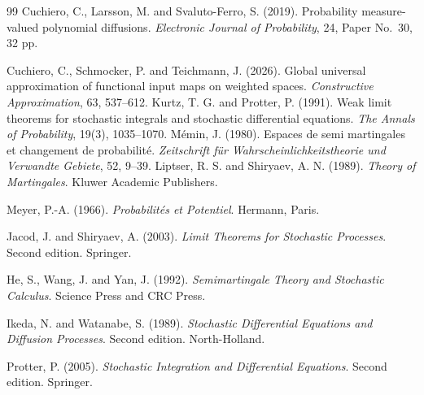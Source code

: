 \documentclass[a4paper,10pt]{article}
\begin{document}
\begin{thebibliography}{99}
Cuchiero, C., Larsson, M. and Svaluto-Ferro, S. (2019).
Probability measure-valued polynomial diffusions.
\emph{Electronic Journal of Probability}, 24, Paper No.~30, 32 pp.

Cuchiero, C., Schmocker, P. and Teichmann, J. (2026).
Global universal approximation of functional input maps on weighted
spaces.
\emph{Constructive Approximation}, 63, 537--612.
Kurtz, T. G. and Protter, P. (1991).
Weak limit theorems for stochastic integrals and stochastic differential equations.
\emph{The Annals of Probability}, 19(3), 1035--1070.
M\'emin, J. (1980).
Espaces de semi martingales et changement de probabilit\'e.
\emph{Zeitschrift f\"ur Wahrscheinlichkeitstheorie und Verwandte Gebiete},
52, 9--39.
Liptser, R. S. and Shiryaev, A. N. (1989).
\emph{Theory of Martingales}.
Kluwer Academic Publishers.


Meyer, P.-A. (1966).
\emph{Probabilit\'es et Potentiel}.
Hermann, Paris.

Jacod, J. and Shiryaev, A. (2003).
\emph{Limit Theorems for Stochastic Processes}.
Second edition. Springer.

He, S., Wang, J. and Yan, J. (1992).
\emph{Semimartingale Theory and Stochastic Calculus}.
Science Press and CRC Press.

Ikeda, N. and Watanabe, S. (1989).
\emph{Stochastic Differential Equations and Diffusion Processes}.
Second edition. North-Holland.

Protter, P. (2005).
\emph{Stochastic Integration and Differential Equations}.
Second edition. Springer.

\end{thebibliography}
\end{document}
